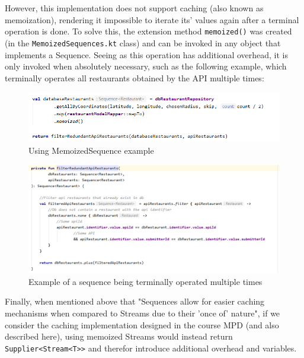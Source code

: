 However, this implementation does not support caching (also known as memoization), rendering it impossible to iterate its' values again after a terminal
operation is done. To solve this, the extension method \texttt{memoized()} was created (in the \texttt{MemoizedSequences.kt} class) and can be invoked in
any object that implements a Sequence. Seeing as this operation has additional overhead, it is only invoked when absolutely necessary,
such as the following example, which terminally operates all restaurants obtained by the API multiple times:\\

\begin{figure}[H]
    \begin{center}
        \includegraphics[scale=0.8]{_figures/5.2.5-2.png}
        \caption{Using MemoizedSequence example}
    \end{center}
\end{figure}

\begin{figure}[H]
    \begin{center}
        \includegraphics[scale=0.6]{_figures/5.2.5-3.png}
        \caption{Example of a sequence being terminally operated multiple times}
    \end{center}
\end{figure}

Finally, when mentioned above that "Sequences allow for easier caching mechanisms when compared to Streams due to their 'once of' nature", if we consider the
caching implementation designed in the course MPD (and also described here\cite{replay-java-streams}), using memoized Streams would
instead return \texttt{Supplier<Stream<T>>} and therefor introduce additional overhead and variables.\\

